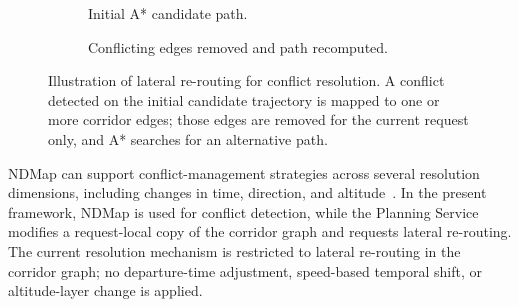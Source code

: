 \begin{figure}[!htbp]
    \centering
    \begin{subfigure}{0.45\textwidth}
        \centering
        \caption{Initial A* candidate path.}
    \end{subfigure}
    \hfill
    \begin{subfigure}{0.45\textwidth}
        \centering
        \caption{Conflicting edges removed and path recomputed.}
    \end{subfigure}
    \caption{Illustration of lateral re-routing for conflict resolution. A conflict detected on the initial candidate trajectory is mapped to one or more corridor edges; those edges are removed for the current request only, and A* searches for an alternative path.}
    \label{fig:conflict_resolution_rerouting}
\end{figure}

NDMap can support conflict-management strategies across several resolution dimensions, including changes in time, direction, and altitude~\cite{NDMap}. In the present framework, NDMap is used for conflict detection, while the Planning Service modifies a request-local copy of the corridor graph and requests lateral re-routing. The current resolution mechanism is restricted to lateral re-routing in the corridor graph; no departure-time adjustment, speed-based temporal shift, or altitude-layer change is applied.


